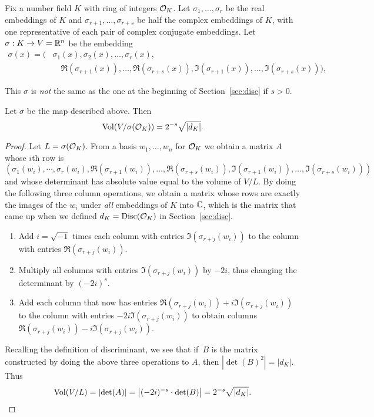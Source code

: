 Fix a number field $K$ with ring of integers $\mathcal{O}_K$.
Let $\sigma_1,\ldots, \sigma_r$ be the real embeddings
of $K$ and $\sigma_{r+1},\ldots, \sigma_{r+s}$ be half
the complex embeddings of $K$, with one representative of
each pair of complex conjugate embeddings.
Let $\sigma:K \to V=\mathbb{R}^n$ be the embedding
\begin{align*}
	\sigma(x) = \big(&\sigma_1(x), \sigma_2(x),\ldots, \sigma_r(x), \\
	&\quad \Re(\sigma_{r+1}(x)), \ldots, \Re(\sigma_{r+s}(x)),
	\Im(\sigma_{r+1}(x)), \ldots, \Im(\sigma_{r+s}(x))\big),
\end{align*}
\begin{warning}
	This $\sigma$ is {\em not} the same as the one
	at the beginning of Section~\ref{sec:disc} if $s>0$.
\end{warning}
\begin{lemma}\label{lem:volok}
	Let $\sigma$ be the map described above. Then
	$$
		\operatorname{Vol}(V/\sigma(\mathcal{O}_K)) = 2^{-s} \sqrt{\left|d_K\right|}.
	$$
\end{lemma}
\begin{proof}
	Let $L=\sigma(\mathcal{O}_K)$.
	From a basis $w_1,\ldots, w_n$ for $\mathcal{O}_K$ we obtain a matrix $A$
	whose $i$th row is
	$$
		(\sigma_1(w_i), \cdots, \sigma_r(w_i),
		\Re(\sigma_{r+1}(w_i)),\ldots, \Re(\sigma_{r+s}(w_i)),
		\Im(\sigma_{r+1}(w_i)),\ldots, \Im(\sigma_{r+s}(w_i)))
	$$
	and whose determinant has absolute value equal to the volume
	of $V/L$.  By doing the following three column operations,
	we obtain a matrix whose rows are exactly the images of
	the $w_i$ under {\em all} embeddings of $K$ into $\mathbb{C}$, which
	is the matrix that came up when we defined
	$d_K=\operatorname{Disc}(\mathcal{O}_K)$ in Section~\ref{sec:disc}.
	\begin{enumerate}
		\item
		Add $i=\sqrt{-1}$ times each column with entries $\Im(\sigma_{r+j}(w_i))$
		to the column with entries $\Re(\sigma_{r+j}(w_i))$.
		\item
		Multiply all columns with entries $\Im(\sigma_{r+j}(w_i))$
		by $-2i$, thus changing the determinant by $(-2i)^s$.
		\item
		Add each column that now has entries
		$\Re(\sigma_{r+j}(w_i))+i\Im(\sigma_{r+j}(w_i))$
		to the column with entries $-2i\Im(\sigma_{r+j}(w_i))$
		to obtain columns $\Re(\sigma_{r+j}(w_i))-i\Im(\sigma_{r+j}(w_i))$.
	\end{enumerate}
	Recalling the definition of discriminant, we see that if~$B$
	is the matrix constructed by doing the above three
	operations to $A$, then $\left|\det(B)^2\right| = \left|d_K\right|$.
	Thus
	$$
		\operatorname{Vol}(V/L)
		= \left|\det(A)\right|
		= \left|(-2i)^{-s}\cdot \det(B)\right|
		= 2^{-s}\sqrt{\left|d_K\right|}.
	$$
\end{proof}

